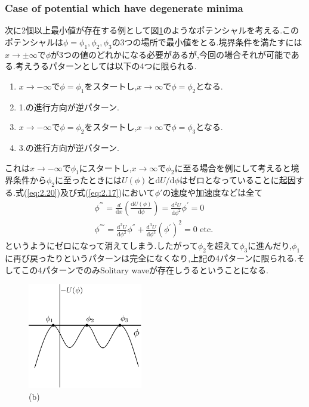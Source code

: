 \documentclass[dvipdfmx,11pt,a4paper,oneside,openany]{jsbook}
\begin{document}
\subsubsection{Case of potential which have degenerate minima}
次に2個以上最小値が存在する例として図\ref{potential2}のようなポテンシャルを考える.このポテンシャルは$\phi=\phi_1,\phi_2,\phi_3$の3つの場所で最小値をとる.境界条件を満たすには$x\rightarrow \pm \infty$で$\phi$が3つの値のどれかになる必要があるが,今回の場合それが可能である.考えうるパターンとしては以下の4つに限られる.
\begin{enumerate}
    \item $x\rightarrow -\infty$で$\phi=\phi_1$をスタートし,$x\rightarrow \infty$で$\phi=\phi_2$となる.
    \item 1.の進行方向が逆パターン.
    \item $x\rightarrow -\infty$で$\phi=\phi_2$をスタートし,$x\rightarrow \infty$で$\phi=\phi_3$となる.
    \item 3.の進行方向が逆パターン.
\end{enumerate}
これは$x\rightarrow -\infty$で$\phi_1$にスタートし,$x\rightarrow \infty$で$\phi_2$に至る場合を例にして考えると境界条件から$\phi_2$に至ったときには$U(\phi)$と$\mathrm{d}U/\mathrm{d}\phi$はゼロとなっていることに起因する.式(\ref{eq:2.20})及び式(\ref{eq:2.17})において$\phi'$の速度や加速度などは全て
\begin{align}
    \phi^{'''}=\frac{d}{\mathrm{d} x}\left(\frac{\mathrm{d} U(\phi)}{\mathrm{d} \phi}\right)=\frac{\mathrm{d}^{2} U}{\mathrm{d} \phi^{2}} \phi^{'}=0\nonumber \\
    \phi^{''''}=\frac{\mathrm{d}^{2} U}{\mathrm{d} \phi^{2}} \phi^{''}+\frac{\mathrm{d}^{3} U}{\mathrm{d} \phi^{3}}\left(\phi^{'}\right)^{2}=0 \text { etc. }
\end{align}
というようにゼロになって消えてしまう.したがって$\phi_2$を超えて$\phi_3$に進んだり,$\phi_1$に再び戻ったりというパターンは完全になくなり,上記の4パターンに限られる.そしてこの4パターンでのみSolitary waveが存在しうるということになる.

\begin{figure}[H]
    \centering
    \includegraphics[width=5cm]{figure/potential2.png}
    \caption{(b)}
    \label{potential2}
\end{figure}
\end{document}
